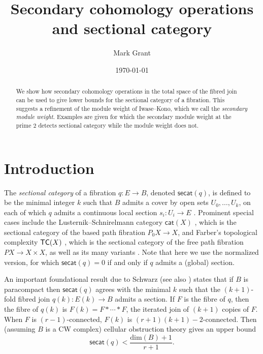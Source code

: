 \documentclass{amsart}
\theoremstyle{plain}
\theoremstyle{definition}
\def\cat{\mathsf{cat}}
\def\secat{\mathsf{secat}}
\def\dim{\mathrm{dim}}
\newcommand{\TC}{{\sf TC}}
\begin{document}
\title[Secondary operations]{Secondary cohomology operations and sectional category}

\author{Mark Grant}


\address{Institute of Mathematics,
Fraser Noble Building,
University of Aberdeen,
Aberdeen AB24 3UE,
UK}



\date{\today}



\begin{abstract} 
We show how secondary cohomology operations in the total space of the fibred join can be used to give lower bounds for the sectional category of a fibration. This suggests a refinement of the module weight of Iwase--Kono, which we call the {\em secondary module weight}. Examples are given for which the secondary module weight at the prime $2$ detects sectional category while the module weight does not.
\end{abstract}

\maketitle
\section{Introduction}\label{sec:intro}

The {\em sectional category} of a fibration $q:E\to B$, denoted $\secat(q)$, is defined to be the minimal integer $k$ such that $B$ admits a cover by open sets $U_0,\ldots , U_k$, on each of which $q$ admits a continuous local section $s_i:U_i\to E$ \cite{Schwarz,James}. Prominent special cases include the Lusternik--Schnirelmann category $\cat(X)$ \cite{CLOT}, which is the sectional category of the based path fibration $P_0 X\to X$, and Farber's topological complexity $\TC(X)$ \cite{Far03,Far04}, which is the sectional category of the free path fibration $PX\to X\times X$, as well as its many variants \cite{FG07,Rudyak,CFW}. Note that here we use the normalized version, for which $\secat(q)=0$ if and only if $q$ admits a (global) section. 

An important foundational result due to Schwarz \cite{Schwarz} (see also \cite{James}) states that if $B$ is paracompact then $\secat(q)$ agrees with the minimal $k$ such that the $(k+1)$-fold fibred join $q(k):E(k)\to B$ admits a section. If $F$ is the fibre of $q$, then the fibre of $q(k)$ is $F(k)=F\ast \cdots \ast F$, the iterated join of $(k+1)$ copies of $F$. When $F$ is $(r-1)$-connected, $F(k)$ is $(r+1)(k+1)-2$-connected. Then (assuming $B$ is a CW complex) cellular obstruction theory gives an upper bound
\[
\secat(q)< \frac{\dim(B)+1}{r+1}.
\]
\end{document}
